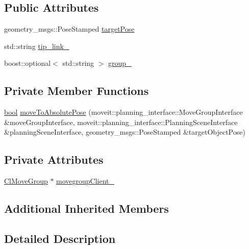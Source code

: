 \subsection*{Public Attributes}
\begin{DoxyCompactItemize}
\item 
geometry\+\_\+msgs\+::\+Pose\+Stamped \hyperlink{classmoveit__z__client_1_1CbMoveEndEffector_abea9c6077733077baced34c6098c6140}{target\+Pose}
\item 
std\+::string \hyperlink{classmoveit__z__client_1_1CbMoveEndEffector_abd92e9d3d67bdde11f9e38e0b44a2b8b}{tip\+\_\+link\+\_\+}
\item 
boost\+::optional$<$ std\+::string $>$ \hyperlink{classmoveit__z__client_1_1CbMoveEndEffector_ab2d23ae054dbc0c2a5f3e6bbc84e07dd}{group\+\_\+}
\end{DoxyCompactItemize}
\subsection*{Private Member Functions}
\begin{DoxyCompactItemize}
\item 
\hyperlink{classbool}{bool} \hyperlink{classmoveit__z__client_1_1CbMoveEndEffector_a4b77954562c23ba6d0aa0f9c805dfd8d}{move\+To\+Absolute\+Pose} (moveit\+::planning\+\_\+interface\+::\+Move\+Group\+Interface \&move\+Group\+Interface, moveit\+::planning\+\_\+interface\+::\+Planning\+Scene\+Interface \&planning\+Scene\+Interface, geometry\+\_\+msgs\+::\+Pose\+Stamped \&target\+Object\+Pose)
\end{DoxyCompactItemize}
\subsection*{Private Attributes}
\begin{DoxyCompactItemize}
\item 
\hyperlink{classmoveit__z__client_1_1ClMoveGroup}{Cl\+Move\+Group} $\ast$ \hyperlink{classmoveit__z__client_1_1CbMoveEndEffector_af62a434c16849885a085e30b8ae70e00}{movegroup\+Client\+\_\+}
\end{DoxyCompactItemize}
\subsection*{Additional Inherited Members}


\subsection{Detailed Description}


